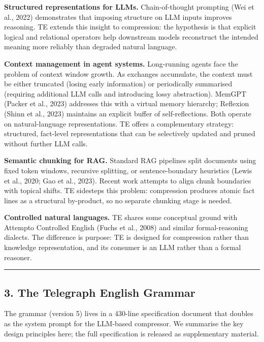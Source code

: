 \documentclass[
]{article}
\begin{document}
\textbf{Structured representations for LLMs.} Chain-of-thought prompting
(Wei et al., 2022) demonstrates that imposing structure on LLM inputs
improves reasoning. TE extends this insight to compression: the
hypothesis is that explicit logical and relational operators help
downstream models reconstruct the intended meaning more reliably than
degraded natural language.

\textbf{Context management in agent systems.} Long-running agents face
the problem of context window growth. As exchanges accumulate, the
context must be either truncated (losing early information) or
periodically summarised (requiring additional LLM calls and introducing
lossy abstraction). MemGPT (Packer et al., 2023) addresses this with a
virtual memory hierarchy; Reflexion (Shinn et al., 2023) maintains an
explicit buffer of self-reflections. Both operate on natural-language
representations. TE offers a complementary strategy: structured,
fact-level representations that can be selectively updated and pruned
without further LLM calls.

\textbf{Semantic chunking for RAG.} Standard RAG pipelines split
documents using fixed token windows, recursive splitting, or
sentence-boundary heuristics (Lewis et al., 2020; Gao et al., 2023).
Recent work attempts to align chunk boundaries with topical shifts. TE
sidesteps this problem: compression produces atomic fact lines as a
structural by-product, so no separate chunking stage is needed.

\textbf{Controlled natural languages.} TE shares some conceptual ground
with Attempto Controlled English (Fuchs et al., 2008) and similar
formal-reasoning dialects. The difference is purpose: TE is designed for
compression rather than knowledge representation, and its consumer is an
LLM rather than a formal reasoner.

\begin{center}\rule{0.5\linewidth}{0.5pt}\end{center}

\subsection{3. The Telegraph English
Grammar}\label{the-telegraph-english-grammar}

The grammar (version 5) lives in a 430-line specification document that
doubles as the system prompt for the LLM-based compressor. We summarise
the key design principles here; the full specification is released as
supplementary material.
\end{document}
